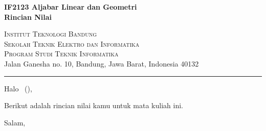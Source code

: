 \documentclass{letter}
\date{\today\hspace{0.025\linewidth}\vspace{-2.5em}}
\newcommand{\university}{Institut Teknologi Bandung} %
\newcommand{\faculty}{Sekolah Teknik Elektro dan Informatika} %
\newcommand{\studyprogram}{Program Studi Teknik Informatika} %
\newcommand{\uniaddress}{Jalan Ganesha no. 10, Bandung, Jawa Barat, Indonesia 40132} %
\newcommand{\course}{IF2123 Aljabar Linear dan Geometri} %
\newcommand{\lecturername}{Nama Dosen} %
\newcommand{\lettertitle}{
    \centering
    \textbf{\course}\\ 
    \textbf{Rincian Nilai} %
    }
\newcommand{\createheader}{
    {\centering
        {
            \large
            \textsc{\university}\\
            \textsc{\faculty}\\
            \textsc{\studyprogram}\\[.25em]
        } 
        \uniaddress\\
    }
    {\centering\noindent\rule{0.95\linewidth}{0.4pt}\par}
}
\begin{document}
\begin{letter}{\lettertitle}
    \createheader

    \opening{Halo \studentname \ (\studentid),}
    Berikut adalah rincian nilai kamu untuk mata kuliah ini.

    \scoretable

    \signature{\lecturername}
    \closing{Salam,}

\end{letter}
\end{document}

